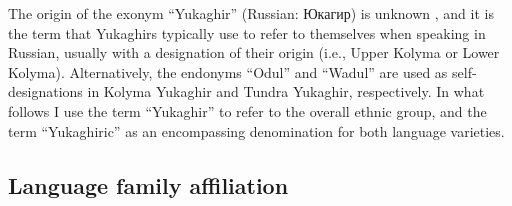 \documentclass[output=paper,colorlinks,citecolor=brown
\ChapterDOI{10.5281/zenodo.15697581}
]{langscibook}
\begin{document}
The origin of the exonym ``Yukaghir'' (Russian: Юкагир) is unknown \citep[21]{Maslova2003}, and it is the term that Yukaghirs typically use to refer to themselves when speaking in Russian, usually with a designation of their origin (i.e., Upper Kolyma or Lower Kolyma). 
Alternatively, the endonyms ``Odul'' and ``Wadul'' are used as self-designations in Kolyma Yukaghir and Tundra Yukaghir, respectively. 
In what follows I use the term ``Yukaghir'' to refer to the overall ethnic group, and the term ``Yukaghiric'' as an encompassing denomination for both language varieties. 


\subsection{Language family affiliation}
 

\end{document}
